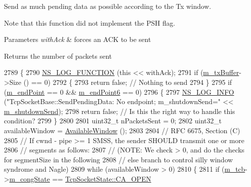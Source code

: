 Send as much pending data as possible according to the Tx window. 

Note that this function did not implement the P\+SH flag.


\begin{DoxyParams}{Parameters}
{\em with\+Ack} & forces an A\+CK to be sent \\
\hline
\end{DoxyParams}
\begin{DoxyReturn}{Returns}
the number of packets sent 
\end{DoxyReturn}

\begin{DoxyCode}
2789 \{
2790   \hyperlink{log-macros-disabled_8h_a90b90d5bad1f39cb1b64923ea94c0761}{NS\_LOG\_FUNCTION} (\textcolor{keyword}{this} << withAck);
2791   \textcolor{keywordflow}{if} (\hyperlink{classns3_1_1TcpSocketBase_a4a1b53982ffd851bd07ab8d5005c130e}{m\_txBuffer}->Size () == 0)
2792     \{
2793       \textcolor{keywordflow}{return} \textcolor{keyword}{false};                           \textcolor{comment}{// Nothing to send}
2794     \}
2795   \textcolor{keywordflow}{if} (\hyperlink{classns3_1_1TcpSocketBase_a78a4181c0a7394749110ea6b194de467}{m\_endPoint} == 0 && \hyperlink{classns3_1_1TcpSocketBase_ab4b114c3959ee672b4fc9b7a90540dba}{m\_endPoint6} == 0)
2796     \{
2797       \hyperlink{group__logging_gafbd73ee2cf9f26b319f49086d8e860fb}{NS\_LOG\_INFO} (\textcolor{stringliteral}{"TcpSocketBase::SendPendingData: No endpoint; m\_shutdownSend="} << 
      \hyperlink{classns3_1_1TcpSocketBase_a443b4ee2b08a845f9429e150d1171a23}{m\_shutdownSend});
2798       \textcolor{keywordflow}{return} \textcolor{keyword}{false}; \textcolor{comment}{// Is this the right way to handle this condition?}
2799     \}
2800 
2801   uint32\_t nPacketsSent = 0;
2802   uint32\_t availableWindow = \hyperlink{classns3_1_1TcpSocketBase_add825047dd7c82046d42087e29b7c5b7}{AvailableWindow} ();
2803 
2804   \textcolor{comment}{// RFC 6675, Section (C)}
2805   \textcolor{comment}{// If cwnd - pipe >= 1 SMSS, the sender SHOULD transmit one or more}
2806   \textcolor{comment}{// segments as follows:}
2807   \textcolor{comment}{// (NOTE: We check > 0, and do the checks for segmentSize in the following}
2808   \textcolor{comment}{// else branch to control silly window syndrome and Nagle)}
2809   \textcolor{keywordflow}{while} (availableWindow > 0)
2810     \{
2811       \textcolor{keywordflow}{if} (\hyperlink{classns3_1_1TcpSocketBase_a26bbaf59001308dc43fb630d76f2e38b}{m\_tcb}->\hyperlink{classns3_1_1TcpSocketState_a4053e1eb120c572d0881b04620b52c30}{m\_congState} == \hyperlink{classns3_1_1TcpSocketState_a6fc313945a33d48fd60cbffe0c787b19af2d22f02a77b603394c34d4968bad142}{TcpSocketState::CA\_OPEN}

\end{DoxyCode}
